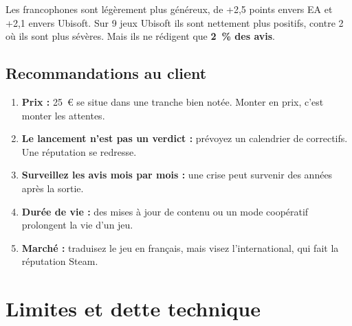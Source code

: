 \documentclass[11pt, a4paper, oneside, headings=normal, numbers=noenddot, DIV=12]{scrartcl}
\begin{document}
Les francophones sont légèrement plus généreux, de +2,5 points envers EA et +2,1 envers Ubisoft. Sur 9 jeux Ubisoft ils sont nettement
plus positifs, contre 2 où ils sont plus sévères. Mais ils ne rédigent que \textbf{2~\% des avis}.

\subsection{Recommandations au client}
\begin{keybox}
\begin{enumerate}[leftmargin=1.4em]
  \item \textbf{Prix :} 25~€ se situe dans une tranche bien notée. Monter en prix, c'est monter les attentes.
  \item \textbf{Le lancement n'est pas un verdict :} prévoyez un calendrier de correctifs. Une réputation se redresse.
  \item \textbf{Surveillez les avis mois par mois :} une crise peut survenir des années après la sortie.
  \item \textbf{Durée de vie :} des mises à jour de contenu ou un mode coopératif prolongent la vie d'un jeu.
  \item \textbf{Marché :} traduisez le jeu en français, mais visez l'international, qui fait la réputation Steam.
\end{enumerate}
\end{keybox}

\section{Limites et dette technique}\label{sec:limites}
\end{document}
